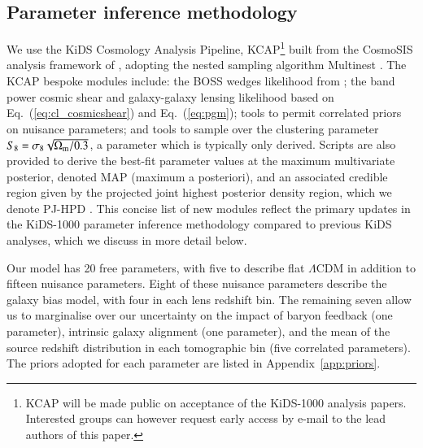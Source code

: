 \subsection{Parameter inference methodology}
\label{sec:KCAP}
We use the KiDS Cosmology Analysis Pipeline, {\sc KCAP}\footnote{KCAP will be made public on acceptance of the KiDS-1000 analysis papers.   Interested groups can however request early access by e-mail to the lead authors of this paper.} built from the {\sc CosmoSIS} analysis framework of \citet{zuntz/etal:2015}, adopting the nested sampling algorithm {\sc Multinest} \citep{feroz/hobson:2008,feroz/etal:2009,feroz/etal:2019}.  The {\sc KCAP} bespoke modules include: the BOSS wedges likelihood from \citet{sanchez/etal:2017}; the band power cosmic shear and galaxy-galaxy lensing likelihood based on Eq.~(\ref{eq:cl_cosmicshear}) and Eq.~(\ref{eq:pgm});  tools to permit correlated priors on nuisance parameters; and tools to sample over the clustering parameter $S_8= \sigma_8 \sqrt{\Omega_{\rm m}/0.3}$, a parameter which is typically only derived.  Scripts are also provided to derive the best-fit parameter values at the maximum multivariate posterior, denoted MAP (maximum a posteriori), and an associated credible region given by the projected joint highest posterior density region, which we denote PJ-HPD \citep{joachimi/etal:inprep}.  This concise list of new modules reflect the primary updates in the KiDS-1000 parameter inference methodology compared to previous KiDS analyses, which we discuss in more detail below.

Our \tttp model has 20 free parameters, with five to describe flat $\Lambda$CDM in addition to fifteen nuisance parameters.   Eight of these nuisance parameters describe the galaxy bias model, with four in each lens redshift bin. The remaining seven allow us to marginalise over our uncertainty on the impact of baryon feedback (one parameter), intrinsic galaxy alignment (one parameter), and the mean of the source redshift distribution in each tomographic bin (five correlated parameters).   The priors adopted for each parameter are listed in Appendix~\ref{app:priors}.  

